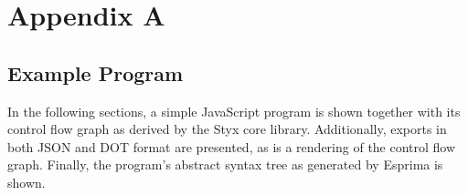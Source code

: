 \section{Appendix A}
\label{sec:appendix}

\subsection{Example Program}

In the following sections, a simple JavaScript program is shown together with its control flow graph as derived by the Styx core library. Additionally, exports in both JSON and DOT format are presented, as is a rendering of the control flow graph. Finally, the program's abstract syntax tree as generated by Esprima is shown.



\newpage


\newpage


\newpage


\newpage

